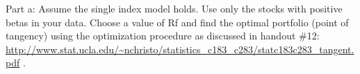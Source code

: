 \documentclass[
]{article}
\newenvironment{Shaded}{\begin{snugshade}}{\end{snugshade}}
\newcommand{\ControlFlowTok}[1]{\textcolor[rgb]{0.13,0.29,0.53}{\textbf{#1}}}
\newcommand{\DecValTok}[1]{\textcolor[rgb]{0.00,0.00,0.81}{#1}}
\newcommand{\FunctionTok}[1]{\textcolor[rgb]{0.00,0.00,0.00}{#1}}
\newcommand{\NormalTok}[1]{#1}
\newcommand{\OtherTok}[1]{\textcolor[rgb]{0.56,0.35,0.01}{#1}}
\newcommand{\SpecialCharTok}[1]{\textcolor[rgb]{0.00,0.00,0.00}{#1}}
\begin{document}
\begin{Shaded}
\end{Shaded}

Part a: Assume the single index model holds. Use only the stocks with
positive betas in your data. Choose a value of Rf and find the optimal
portfolio (point of tangency) using the optimization procedure as
discussed in handout \#12:
\url{http://www.stat.ucla.edu/~nchristo/statistics_c183_c283/statc183c283_tangent.pdf}
.
\end{document}
